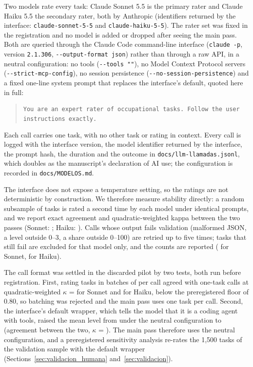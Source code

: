 Two models rate every task: Claude Sonnet 5.5 is the primary rater and Claude Haiku 5.5 the secondary rater, both by Anthropic (identifiers returned by the interface: \texttt{claude-sonnet-5-5} and \texttt{claude-haiku-5-5}).
The rater set was fixed in the registration and no model is added or dropped after seeing the main pass.
Both are queried through the Claude Code command-line interface (\texttt{claude -p}, version \texttt{2.1.306}, \texttt{-{}-output-format json}) rather than through a raw API, in a neutral configuration: no tools (\texttt{-{}-tools ""}), no Model Context Protocol servers (\texttt{-{}-strict-mcp-config}), no session persistence (\texttt{-{}-no-session-persistence}) and a fixed one-line system prompt that replaces the interface's default, quoted here in full:
\begin{quote}\small\texttt{You are an expert rater of occupational tasks. Follow the user instructions exactly.}\end{quote}
Each call carries one task, with no other task or rating in context.
Every call is logged with the interface version, the model identifier returned by the interface, the prompt hash, the duration and the outcome in \texttt{docs/llm-llamadas.jsonl}, which doubles as the manuscript's declaration of AI use; the configuration is recorded in \texttt{docs/MODELOS.md}.

The interface does not expose a temperature setting, so the ratings are not deterministic by construction.
We therefore measure stability directly: a random subsample of  tasks is rated a second time by each model under identical prompts, and we report exact agreement and quadratic-weighted kappa between the two passes (Sonnet: ; Haiku: ).
Calls whose output fails validation (malformed JSON, a level outside 0--3, a share outside 0--100) are retried up to five times; tasks that still fail are excluded for that model only, and the counts are reported ( for Sonnet,  for Haiku).

The call format was settled in the discarded pilot by two tests, both run before registration.
First, rating tasks in batches of  per call agreed with one-task calls at quadratic-weighted $\kappa$ =  for Sonnet and  for Haiku, below the preregistered floor of 0.80, so batching was rejected and the main pass uses one task per call.
Second, the interface's default wrapper, which tells the model that it is a coding agent with tools, raised the mean level from  under the neutral configuration to  (agreement between the two, $\kappa$ = ).
The main pass therefore uses the neutral configuration, and a preregistered sensitivity analysis re-rates the 1,500 tasks of the validation sample with the default wrapper (Sections~\ref{sec:validacion_humana} and~\ref{sec:validacion}).

